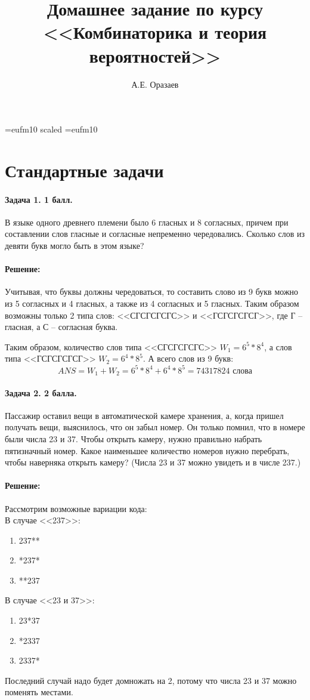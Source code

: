 \documentclass[12pt]{article}
\title{\bf Домашнее задание по курсу \\ <<Комбинаторика 
и теория вероятностей>>}
\author{А.Е. Оразаев}
\date{}
\begin{document}
\voffset=-20mm 
\hoffset=-12mm
\font\Got=eufm10 scaled \font\Got=eufm10

\maketitle

\section{Стандартные задачи}



\paragraph{Задача 1. 1 балл.} В языке одного древнего племени было 
6 гласных и 8 согласных, причем при составлении слов гласные и 
согласные непременно чередовались. Сколько слов из девяти букв 
могло быть в этом языке? 

\paragraph{\bf Решение:}
Учитывая, что буквы должны чередоваться, то составить слово из 9 букв
можно из 5 согласных и 4 гласных, а также из 4 согласных и 5 гласных.
Таким образом возможны только 2 типа слов: <<СГСГСГСГС>> и <<ГСГСГСГСГ>>, где
Г -- гласная, а С -- согласная буква.

Таким образом, количество слов типа <<СГСГСГСГС>> $ W_1 = 6^5 * 8^4 $,
а слов типа <<ГСГСГСГСГ>> $ W_2 = 6^4 * 8^5 $. А всего слов из 9 букв:
$$ ANS = W_1 + W_2 = 6^5 * 8^4 + 6^4 * 8^5 = 74317824 \text{ слова}$$



\paragraph{Задача 2. 2 балла.} Пассажир оставил вещи в 
автоматической камере хранения, а, когда пришел получать вещи, 
выяснилось, что он забыл номер. Он только помнил, что в номере 
были числа 23 и 37. Чтобы открыть камеру, нужно правильно 
набрать пятизначный номер. Какое наименьшее количество номеров 
нужно перебрать, чтобы наверняка открыть камеру? (Числа 23 и 37 
можно увидеть и в числе 237.)

\paragraph{\bf Решение:}
Рассмотрим возможные вариации кода: \\
В случае <<237>>:
\begin{enumerate}
\item 237**
\item *237*
\item **237
\end{enumerate}
В случае <<23 и 37>>:
\begin{enumerate}
\item 23*37
\item *2337
\item 2337*
\end{enumerate}
Последний случай надо будет домножать на 2, потому что числа 23 и 37
можно поменять местами.
\end{document}
